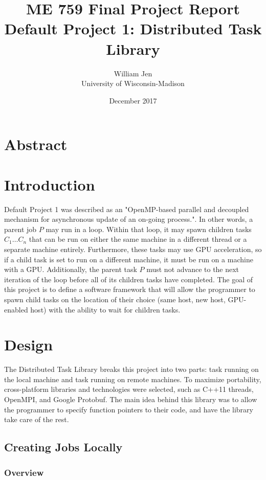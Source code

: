 \documentclass[11pt]{article}
\title{\vspace{10em}ME 759 Final Project Report \\ Default Project 1: Distributed Task Library}
\author{William Jen \\ University of Wisconsin-Madison}
\date{December 2017}
\begin{document}
	\maketitle

	\pagebreak
	\section{Abstract}
	
	\pagebreak
	\tableofcontents
	\pagebreak
	
	\section{Introduction}
		Default Project 1 was described as an "OpenMP-based parallel and decoupled mechanism for
		asynchronous update of an on-going process.". In other words, a parent job $P$ may run in 
		a loop. Within that loop, it may spawn children tasks $C_1 \ldots C_n$ that can be run on either
		the same machine in a different thread or a separate machine entirely. Furthermore, these tasks may
		use GPU acceleration, so if a child task is set to run on a different machine, it must be run on a 
		machine with a GPU. Additionally, the parent task $P$ must not advance to the next iteration of the loop
		before all of its children tasks have completed. The goal of this project is to define a software framework 
		that will allow the programmer to spawn child tasks on the location of their choice (same host, new host, 
		GPU-enabled host) with the ability to wait for children tasks.
	
	\section{Design}
		The Distributed Task Library breaks this project into two parts: task running on the local machine and 
		task running on remote machines. To maximize portability, cross-platform libraries and technologies 
		were selected, such as C++11 threads, OpenMPI, and Google Protobuf. The main idea behind this library
		was to allow the programmer to specify function pointers to their code, and have the library take care of
		the rest. 

		\subsection{Creating Jobs Locally}
			\subsubsection{Overview}
			
\end{document}
